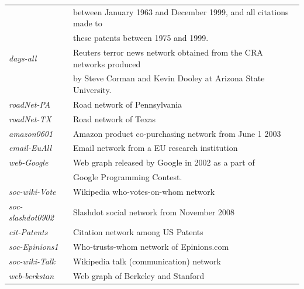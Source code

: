 \begin{table}[!h]
\begin{tabular}{ll}
& between January 1963 and December 1999, and all citations made to\\
& these patents between 1975 and 1999. 	\\\hline
{\it days-all} \cite{corman2002}	& Reuters terror news network obtained from the CRA networks produced \\
& by Steve Corman and Kevin Dooley at Arizona State University.	\\\hline
{\it roadNet-PA} \cite{Leskovec:2005:GOT:1081870.1081893}	& Road network of Pennsylvania	\\\hline
{\it roadNet-TX} \cite{Leskovec:2005:GOT:1081870.1081893}	& Road network of Texas	\\\hline
{\it amazon0601} \cite{leskovec2007}	& Amazon product co-purchasing network from June 1 2003 \\\hline
{\it email-EuAll} \cite{leskovec2007-2}	& Email network from a EU research institution	\\\hline
{\it web-Google} \cite{web-google}	& Web graph released by Google in 2002 as a part of \\
& Google Programming Contest.	\\\hline
{\it soc-wiki-Vote} \cite{leskovec2010}	& Wikipedia who-votes-on-whom network	\\\hline
{\it soc-slashdot0902} \cite{Leskovec:2005:GOT:1081870.1081893}	& Slashdot social network from November 2008	\\\hline
{\it cit-Patents} \cite{hall2001}	& Citation network among US Patents	\\\hline
{\it soc-Epinions1} \cite{richardson2003}	&	Who-trusts-whom network of Epinions.com \\\hline
{\it soc-wiki-Talk} \cite{leskovec2010}	&	Wikipedia talk (communication) network \\\hline
{\it web-berkstan} \cite{Leskovec:2005:GOT:1081870.1081893}	& Web graph of Berkeley and Stanford	\\\hline

\end{tabular}
\end{table}

